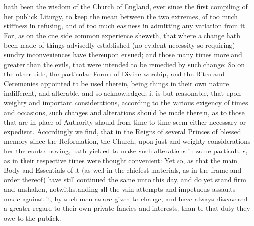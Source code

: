 
 hath been the wisdom of the Church of England, ever since the first compiling of her publick Liturgy, to keep the mean between the two extremes, of too much stiffness in refusing, and of too much easiness in admitting any variation from it. For, as on the one side common experience sheweth, that where a change hath been made of things advisedly established (no evident necessity so requiring) sundry inconveniences have thereupon ensued; and those many times more and greater than the evils, that were intended to be remedied by such change: So on the other side, the particular Forms of Divine worship, and the Rites and Ceremonies appointed to be used therein, being things in their own nature indifferent, and alterable, and so acknowledged; it is but reasonable, that upon weighty and important considerations, according to the various exigency of times and occasions, such changes and alterations should be made therein, as to those that are in place of Authority should from time to time seem either necessary or expedient. Accordingly we find, that in the Reigns of several Princes of blessed memory since the Reformation, the Church, upon just and weighty considerations her thereunto moving, hath yielded to make such alterations in some particulars, as in their respective times were thought convenient: Yet so, as that the main Body and Essentials of it (as well in the chiefest materials, as in the frame and order thereof) have still continued the same unto this day, and do yet stand firm and unshaken, notwithstanding all the vain attempts and impetuous assaults made against it, by such men as are given to change, and have always discovered a greater regard to their own private fancies and interests, than to that duty they owe to the publick.

